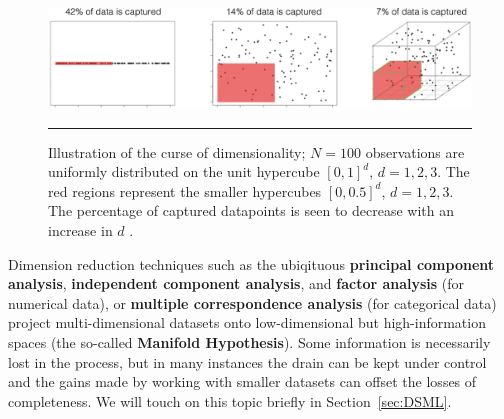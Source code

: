 \begin{figure}[t]
\centering
\includegraphics[width=\textwidth]{images/DP/COD.png}\caption[\small Illustration of the curse of dimensionality]{\small Illustration of the curse of dimensionality; $N=100$ observations are uniformly distributed on the unit hypercube $[0,1]^d$, $d=1, 2, 3$. The red regions represent the smaller hypercubes $[0,0.5]^d$, $d=1,2,3$. The percentage of captured datapoints is seen to decrease with an increase in $d$ \cite{DP_SS}.} \label{fig:COD}\hrule
\end{figure}
\afterpage{\FloatBarrier}
Dimension reduction techniques such as the ubiqituous \textbf{principal component analysis}, \textbf{independent component analysis}, and \textbf{factor analysis} (for numerical data), or \textbf{multiple correspondence analysis} (for categorical data) project multi-dimensional datasets onto low-dimensional but high-information spaces (the so-called \textbf{Manifold Hypothesis}). Some information is necessarily lost in the process, but in many instances the drain can be kept under control and the gains made by working with smaller datasets can offset the losses of completeness. We will touch on this topic briefly in Section~\ref{sec:DSML}.
